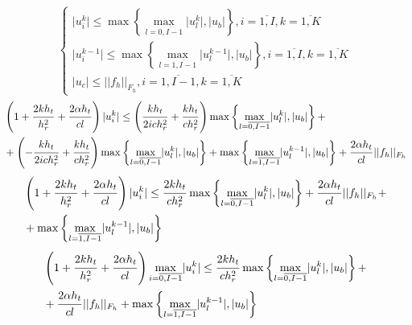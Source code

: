 \documentclass[a4paper,12pt,russian, fleqn]{extreport}
\begin{document}
	\begin{equation}
		\left\{
		\begin{array}{l}
			\vert u_i^k \vert \leq \max\left\{\max\limits_{l = \overline{0, I-1}}\lvert u_l^k \rvert, \lvert u_b \rvert \right\}, i =\overline{1, I}, k = \overline{1, K} \\
			\vert u_i^{k-1} \vert \leq \max\left\{\max\limits_{l = \overline{1, I-1}}\lvert u_l^{k-1} \rvert, \lvert u_b \rvert \right\}, i =\overline{1, I}, k = \overline{1, K} \\
			\lvert u_c \rvert \leq \vert\vert f_h \vert\vert_{F_h}, i = \overline{1, I-1}, k = \overline{1,K}
		\end{array}
		\right.
	\end{equation}
	\begin{align}
		& \left(  1 + \dfrac{\strut 2 k h_t}{\strut h_r^2} + \dfrac{\strut 2 \alpha h_t}{\strut cl} \right)\lvert u^k_i \rvert \leq \left( \dfrac{\strut k h_t}{\strut 2ich_r^2} + \dfrac{\strut k h_t}{\strut c h_r^2} \right)\max\left\{\max\limits_{l = \overline{0, I-1}}\lvert u_l^k \rvert, \lvert u_b \rvert \right\} + \nonumber \\ 
		& + \left(-\dfrac{\strut k h_t}{\strut 2ich_r^2} + \dfrac{\strut k h_t}{\strut c h_r^2}\right) \max\left\{\max\limits_{l = \overline{0, I-1}}\lvert u_l^k \rvert, \lvert u_b \rvert \right\} + \max\left\{\max\limits_{l = \overline{1, I-1}}\lvert u_l^{k-1} \rvert, \lvert u_b \rvert \right\} + \dfrac{\strut 2\alpha h_t}{\strut cl}\lvert \lvert f_h \rvert\rvert_{F_h} 	\nonumber	
	\end{align}
	\begin{align}
		& \left(  1 + \dfrac{\strut 2 k h_t}{\strut h_r^2} + \dfrac{\strut 2 \alpha h_t}{\strut cl} \right)\lvert u^k_i \rvert \leq \dfrac{\strut 2 k h_t}{\strut ch_r^2} \max\left\{\max\limits_{l = \overline{0, I-1}}\lvert u_l^k \rvert, \lvert u_b \rvert \right\} + \dfrac{\strut 2\alpha h_t}{\strut cl}\lvert \lvert f_h \rvert\rvert_{F_h} + \nonumber \\
		& + \max\left\{\max\limits_{l = \overline{1, I-1}}\lvert u_l^{k-1} \rvert, \lvert u_b \rvert \right\} \nonumber
	\end{align}
	\begin{align}
		& \left(  1 + \dfrac{\strut 2 k h_t}{\strut h_r^2} + \dfrac{\strut 2 \alpha h_t}{\strut cl} \right) \max\limits_{i=\overline{0, I-1}} \lvert u^k_i \rvert \leq \dfrac{\strut 2 k h_t}{\strut ch_r^2} \max\left\{\max\limits_{l = \overline{0, I-1}}\lvert u_l^k \rvert, \lvert u_b \rvert \right\} + \nonumber \\ 
		& + \dfrac{\strut 2\alpha h_t}{\strut cl}\lvert \lvert f_h \rvert\rvert_{F_h} + \max\left\{\max\limits_{l = \overline{1, I-1}}\lvert u_l^{k-1} \rvert, \lvert u_b \rvert \right\} \nonumber
	\end{align}	
	
\end{document}
